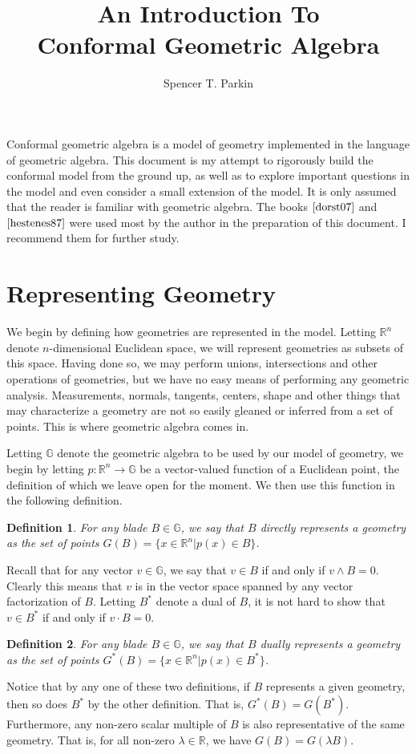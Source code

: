 \documentclass[12pt]{article}
\title{An Introduction To\\Conformal Geometric Algebra}
\author{Spencer T. Parkin}
\newcommand{\G}{\mathbb{G}}
\newcommand{\R}{\mathbb{R}}
\newtheorem{definition}{Definition}[section]
\begin{document}
\maketitle

Conformal geometric algebra is a model of
geometry implemented in the language of geometric algebra.
This document is my attempt to rigorously build the
conformal model from the ground up, as well as to explore
important questions in the model and even consider a small
extension of the model.
It is only assumed that the reader is familiar with geometric algebra.
The books $\cite{dorst07}$ and $\cite{hestenes87}$ were
used most by the author in the preparation of this document.
I recommend them for further study.

\section{Representing Geometry}

We begin by defining how geometries are represented in the model.
Letting $\R^n$ denote $n$-dimensional Euclidean space, we will
represent geometries as subsets of this space.  Having done so,
we may perform unions, intersections and other operations of geometries, but we
have no easy means of performing any geometric analysis.  Measurements, normals,
tangents, centers, shape and other things that may characterize a geometry are not
so easily gleaned or inferred from a set of points.  This is where
geometric algebra comes in.

Letting $\G$ denote the geometric algebra to be used by our model
of geometry, we begin by letting $p:\R^n\to\G$ be a vector-valued
function of a Euclidean point, the definition of which we leave
open for the moment.  We then use this function in the following definition.
\begin{definition}\label{def_direct_rep}
For any blade $B\in\G$, we say that $B$ directly
represents a geometry as the set of points
$G(B)=\{x\in\R^n|p(x)\in B\}$.
\end{definition}
Recall that for any vector $v\in\G$, we say that $v\in B$ if and only if $v\wedge B=0$.
Clearly this means that $v$ is in the vector space spanned by any vector factorization
of $B$.  Letting $B^*$ denote a dual of $B$, it is not hard to show that
$v\in B^*$ if and only if $v\cdot B=0$.
\begin{definition}\label{def_dual_rep}
For any blade $B\in\G$, we say that $B$ dually
represents a geometry as the set of points
$G^*(B)=\{x\in\R^n|p(x)\in B^*\}$.
\end{definition}
Notice that by any one of these two definitions, if $B$ represents
a given geometry, then so does $B^*$ by the other definition.
That is, $G^*(B)=G(B^*)$.
Furthermore, any non-zero scalar multiple of $B$ is also representative
of the same geometry.  That is, for all non-zero $\lambda\in\R$,
we have $G(B)=G(\lambda B)$.
\end{document}
